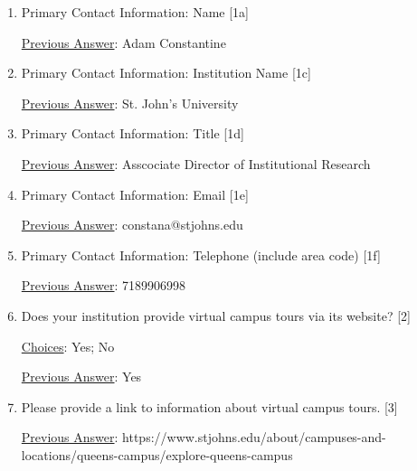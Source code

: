 \documentclass[12 pt, a4paper]{article}
\begin{document}
\begin{Form}
\begin{enumerate}\item Primary Contact Information: Name [1a] \medskip

\underline{Previous Answer}: Adam Constantine\medskip

\TextField[width = 6 in,multiline, name=90000]{} \medskip

\item Primary Contact Information: Institution Name [1c] \medskip

\underline{Previous Answer}: St. John's University\medskip

\TextField[width = 6 in,multiline, name=90001]{} \medskip

\item Primary Contact Information: Title [1d] \medskip

\underline{Previous Answer}: Asscociate Director of Institutional Research\medskip

\TextField[width = 6 in,multiline, name=90002]{} \medskip

\item Primary Contact Information: Email [1e] \medskip

\underline{Previous Answer}: constana@stjohns.edu\medskip

\TextField[width = 6 in,multiline, name=90003]{} \medskip

\item Primary Contact Information: Telephone (include area code) [1f] \medskip

\underline{Previous Answer}: 7189906998\medskip

\TextField[width = 6 in,multiline, name=90004]{} \medskip

\item Does your institution provide virtual campus tours via its website? [2] \medskip

\underline{Choices}: Yes; No\medskip

\underline{Previous Answer}: Yes\medskip

\TextField[width = 6 in,multiline, name=90005]{} \medskip

\item Please provide a link to information about virtual campus tours. [3] \medskip

\underline{Previous Answer}: https://www.stjohns.edu/about/campuses-and-locations/queens-campus/explore-queens-campus\medskip


\end{enumerate}
\end{Form}
\end{document}
